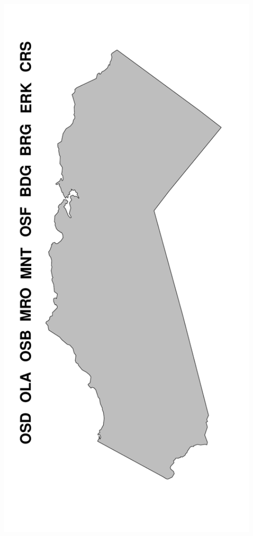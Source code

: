 \documentclass[ xcolor = pdftex, dvipsnames, table ]{beamer}
\begin{document}
\begin{frame}
{\begin{minipage}[h!]{0.19\textwidth}
        \includegraphics[width=1.2\textwidth]{../pictures/mapFullBlank.pdf}
\end{minipage}
}
\end{frame}
\end{document}
